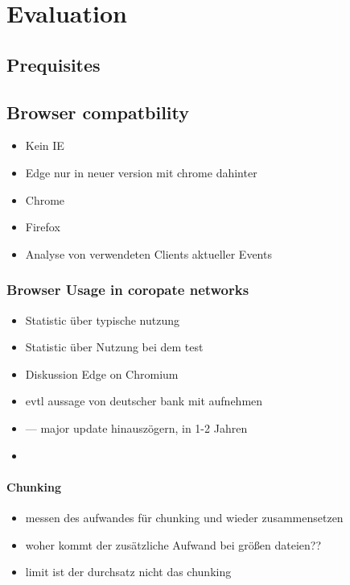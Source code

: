 \chapter{Evaluation}\label{ch:evaluation}

\section{Prequisites}

\section{Browser compatbility}

\begin{itemize}
	\item Kein IE
	\item Edge nur in neuer version mit chrome dahinter
	\item Chrome
	\item Firefox
	\item Analyse von verwendeten Clients aktueller Events
\end{itemize}
\subsection{Browser Usage in coropate networks}

\begin{itemize}
	\item Statistic über typische nutzung
	\item Statistic über Nutzung bei dem test
	\item Diskussion Edge on Chromium
	\item evtl aussage von deutscher bank mit aufnehmen
	\item  --- major update hinauszögern, in 1-2 Jahren
	\item 
\end{itemize}

\subsubsection{Chunking}
\begin{itemize}
	\item messen des aufwandes für chunking und wieder zusammensetzen
	\item woher kommt der zusätzliche Aufwand bei größen dateien??
	\item limit ist der durchsatz nicht das chunking
\end{itemize}


